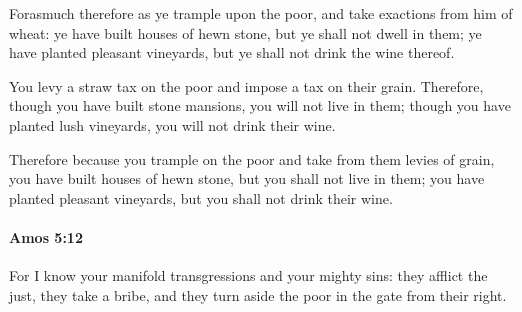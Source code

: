 			\begin{versebox}
					\item[BHS] 
					\item[LXX] 
					\item[ASV] Forasmuch therefore as ye trample upon the poor, and take exactions from him of wheat: ye have built houses of hewn stone, but ye shall not dwell in them; ye have planted pleasant vineyards, but ye shall not drink the wine thereof.
					\item[NIV] You levy a straw tax on the poor and impose a tax on their grain. Therefore, though you have built stone mansions, you will not live in them; though you have planted lush vineyards, you will not drink their wine.
					\item[NRSV] Therefore because you trample on the poor and take from them levies of grain, you have built houses of hewn stone, but you shall not live in them; you have planted pleasant vineyards, but you shall not drink their wine.
			\end{versebox}

		\paragraph{Amos 5:12} %
			\label{AMOS-5-12}

			For I know your manifold transgressions and your mighty sins: they afflict the just, they take a bribe, and they turn aside the poor in the gate from their right.


